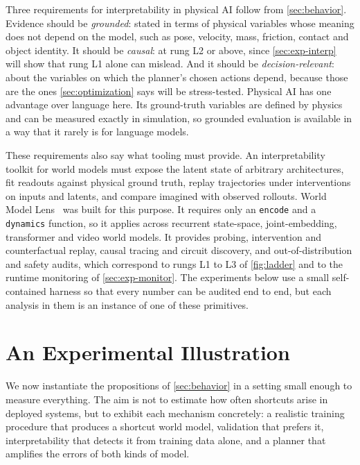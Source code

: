 \documentclass[11pt]{article}
\theoremstyle{definition}\newtheorem{definition}{Definition}
\begin{document}
Three requirements for interpretability in physical AI follow from \cref{sec:behavior}. Evidence should be \emph{grounded}: stated in terms of physical variables whose meaning does not depend on the model, such as pose, velocity, mass, friction, contact and object identity. It should be \emph{causal}: at rung L2 or above, since \cref{sec:exp-interp} will show that rung L1 alone can mislead. And it should be \emph{decision-relevant}: about the variables on which the planner's chosen actions depend, because those are the ones \cref{sec:optimization} says will be stress-tested. Physical AI has one advantage over language here. Its ground-truth variables are defined by physics and can be measured exactly in simulation, so grounded evaluation is available in a way that it rarely is for language models.

These requirements also say what tooling must provide. An interpretability toolkit for world models must expose the latent state of arbitrary architectures, fit readouts against physical ground truth, replay trajectories under interventions on inputs and latents, and compare imagined with observed rollouts. World Model Lens~\citep{worldmodellens} was built for this purpose. It requires only an \texttt{encode} and a \texttt{dynamics} function, so it applies across recurrent state-space, joint-embedding, transformer and video world models. It provides probing, intervention and counterfactual replay, causal tracing and circuit discovery, and out-of-distribution and safety audits, which correspond to rungs L1 to L3 of \cref{fig:ladder} and to the runtime monitoring of \cref{sec:exp-monitor}. The experiments below use a small self-contained harness so that every number can be audited end to end, but each analysis in them is an instance of one of these primitives.

\section{An Experimental Illustration}\label{sec:experiments}
We now instantiate the propositions of \cref{sec:behavior} in a setting small enough to measure everything. The aim is not to estimate how often shortcuts arise in deployed systems, but to exhibit each mechanism concretely: a realistic training procedure that produces a shortcut world model, validation that prefers it, interpretability that detects it from training data alone, and a planner that amplifies the errors of both kinds of model.
\end{document}
